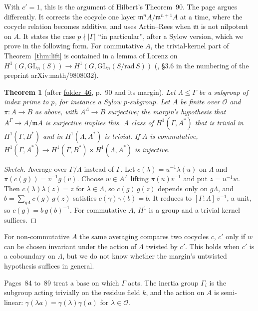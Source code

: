 \documentclass[11pt,a4paper]{amsart}
\newtheorem{theorem}{Theorem}[section]
\theoremstyle{definition}
\theoremstyle{remark}
\newcommand{\cO}{\mathcal O}
\newcommand{\fac}[1]{\href{https://grothendieck.umontpellier.fr/#1.pdf}{folder~#1}}
\begin{document}
With $c' = 1$, this is the argument of Hilbert's Theorem~90. The page argues differently. It corrects the cocycle one layer $\mathfrak m^nA/\mathfrak m^{n+1}A$ at a time, where the cocycle relation becomes additive, and uses Artin--Rees when $\mathfrak m$ is not nilpotent on $A$. It states the case $p \nmid |\Gamma|$ ``in particular'', after a Sylow version, which we prove in the following form. For commutative $A$, the trivial-kernel part of Theorem~\ref{thm:lift} is contained in a lemma of Lorenz on $H^1(G, \mathrm{GL}_n(S)) \to H^1(G, \mathrm{GL}_n(S/\mathrm{rad}\,S))$ (\cite{lorenz1999}, \S3.6 in the numbering of the preprint arXiv:math/9808032).

\begin{theorem}[after \fac{46}, p.~90 and its margin]\label{thm:sylow}
Let $\Lambda \le \Gamma$ be a subgroup of index prime to $p$, for instance a Sylow $p$-subgroup. Let $A$ be finite over $\cO$ and $\pi\colon A \to B$ as above, with $A^\Lambda \to B$ surjective; the margin's hypothesis that $A^\Gamma \to A/\mathfrak mA$ is surjective implies this. A class of $H^1(\Gamma, A^*)$ that is trivial in $H^1(\Gamma, B^*)$ and in $H^1(\Lambda, A^*)$ is trivial. If $A$ is commutative, $H^1(\Gamma, A^*) \to H^1(\Gamma, B^*) \times H^1(\Lambda, A^*)$ is injective.
\end{theorem}

\begin{proof}[Sketch]
Average over $\Gamma/\Lambda$ instead of $\Gamma$. Let $c(\lambda) = u^{-1}\lambda(u)$ on $\Lambda$ and $\pi(c(g)) = \bar v^{-1}g(\bar v)$. Choose $w \in A^\Lambda$ lifting $\pi(u)\bar v^{-1}$ and put $z = u^{-1}w$. Then $c(\lambda)\lambda(z) = z$ for $\lambda \in \Lambda$, so $c(g)\,g(z)$ depends only on $g\Lambda$, and $b = \sum_{g\Lambda} c(g)\,g(z)$ satisfies $c(\gamma)\gamma(b) = b$. It reduces to $[\Gamma:\Lambda]\,\bar v^{-1}$, a unit, so $c(g) = b\,g(b)^{-1}$. For commutative $A$, $H^1$ is a group and a trivial kernel suffices.
\end{proof}

For non-commutative $A$ the same averaging compares two cocycles $c$, $c'$ only if $w$ can be chosen invariant under the action of $\Lambda$ twisted by $c'$. This holds when $c'$ is a coboundary on $\Lambda$, but we do not know whether the margin's untwisted hypothesis suffices in general.

Pages~84 to~89 treat a base on which $\Gamma$ acts. The inertia group $\Gamma_i$ is the subgroup acting trivially on the residue field $k$, and the action on $A$ is semi-linear: $\gamma(\lambda a) = \gamma(\lambda)\gamma(a)$ for $\lambda \in \cO$.
\end{document}
